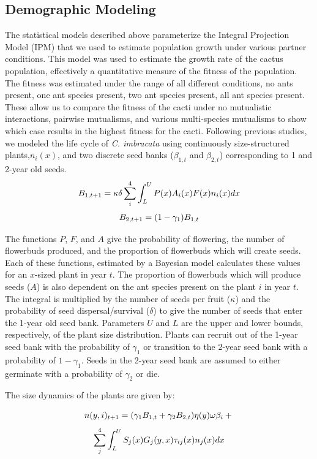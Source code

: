 \documentclass[12pt,a4paper]{article}
\begin{document}
	
	
	\subsection*{Demographic Modeling}
	
	The statistical models described above parameterize the Integral Projection Model (IPM) that we used to estimate population growth under various partner conditions.  This model was used to estimate the growth rate of the cactus population, effectively a quantitative measure of the fitness of the population. The fitness was estimated under the range of all different conditions, no ants present, one ant species present, two ant species present, all ant species present. These allow us to compare the fitness of the cacti under no mutualistic interactions, pairwise mutualisms, and various multi-species mutualisms to show which case results in the highest fitness for the cacti. Following previous studies, we modeled the life cycle of \textit{C. imbracata} using continuously size-structured plants,$n_i(x)$, and two discrete seed banks ($\beta_{1,t}$ and $\beta_{2,t}$) corresponding to 1 and 2-year old seeds.
$$
B_{1, t+1} = \kappa \delta \sum_{i}^{4} \int_L^U P(x) A_i(x) F(x)n_i(x) dx \\
$$
$$
B_{2,t+1} =  (1 - \gamma_1)B_{1,t}\\
$$

    The functions $P$, $F$, and $A$ give the probability of flowering, the number of flowerbuds produced, and the proportion of flowerbuds which will create seeds. Each of these functions, estimated by a Bayesian model calculates these values for an $x$-sized plant in year $t$. The proportion of flowerbuds which will produce seeds ($A$) is also dependent on the ant species present on the plant $i$ in year $t$. The integral is multiplied by the number of seeds per fruit ($\kappa$) and the probability of seed dispersal/survival ($\delta$) to give the number of seeds that enter the 1-year old seed bank. Parameters $U$ and $L$ are the upper and lower  bounds, respectively, of the plant size distribution. Plants can recruit out of the 1-year seed bank with the probability of $\gamma_1$ or transition to the 2-year seed bank with a probability of $1 - \gamma_1$. Seeds in the 2-year seed bank are assumed to either germinate with a probability of $\gamma_2$ or die. 
    
    The size dynamics of the plants are given by:

$$
n(y,i)_{t+1} = (\gamma_1 B_{1,t} + \gamma_2 B_{2,t}) \eta(y) \omega \beta_i  + \\
$$
$$
\sum_{j}^{4} \int_L^U S_j(x) G_j(y,x) \tau_{ij}(x) n_j(x) dx \\
$$
\end{document}
